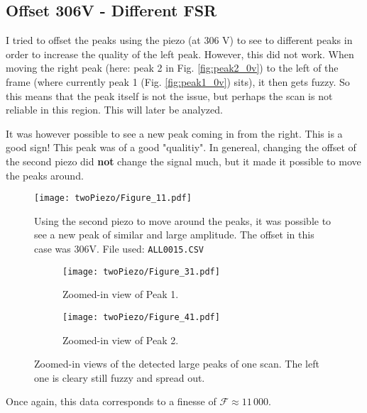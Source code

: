 \subsection{Offset 306V - Different FSR}
I tried to offset the peaks using the piezo (at 306 V) to see to different peaks in order to increase the quality of the left peak. 
However, this did not work.
When moving the right peak (here: peak 2 in Fig. \ref{fig:peak2_0v}) to the left of the frame (where currently peak 1 (Fig. \ref{fig:peak1_0v}) sits), it then gets fuzzy. 
So this means that the peak itself is not the issue, but perhaps the scan is not reliable in this region. This will later be analyzed.

It was however possible to see a new peak coming in from the right.
This is a good sign! 
This peak was of a good "qualitiy". In genereal, changing the offset of the second piezo did \textbf{not} change the signal much, but it made it possible to move the peaks around.


\begin{figure}[H]
    \centering
    \texttt{[image: twoPiezo/Figure\_11.pdf]}
    \caption{Using the second piezo to move around the peaks, it was possible to see a new peak of similar and large amplitude. The offset in this case was 306V. File used: \texttt{ALL0015.CSV}}
\end{figure}


\begin{figure}[H]
    \centering
    \begin{subfigure}[t]{0.48\textwidth}
        \centering
        \texttt{[image: twoPiezo/Figure\_31.pdf]}
        \caption{Zoomed-in view of Peak 1.}
        \label{fig:peak1_low}
    \end{subfigure}
    \hfill
    \begin{subfigure}[t]{0.48\textwidth}
        \centering
        \texttt{[image: twoPiezo/Figure\_41.pdf]}
        \caption{Zoomed-in view of Peak 2.}
        \label{fig:peak2_low}
    \end{subfigure}
    \caption{Zoomed-in views of the detected large peaks of one scan. The left one is cleary still fuzzy and spread out.}
\end{figure}

Once again, this data corresponds to a finesse of $\mathcal{F}\approx11\,000$.

